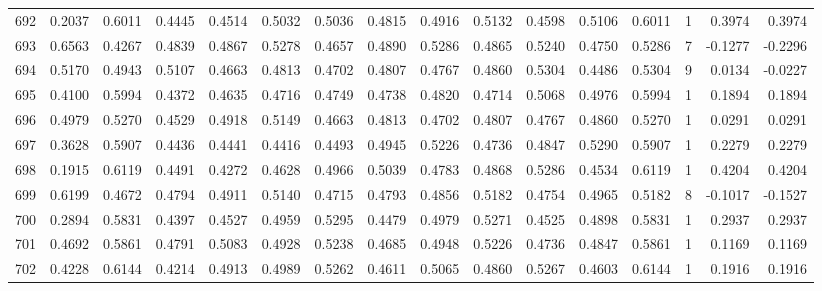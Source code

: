 \begin{tabular}{lrrrrrrrrrrrrrrr}
692 &      0.2037 &  0.6011 &  0.4445 &  0.4514 &  0.5032 &  0.5036 &  0.4815 &  0.4916 &  0.5132 &  0.4598 &   0.5106 &     0.6011 &      1 &                    0.3974 &                     0.3974 \\
693 &      0.6563 &  0.4267 &  0.4839 &  0.4867 &  0.5278 &  0.4657 &  0.4890 &  0.5286 &  0.4865 &  0.5240 &   0.4750 &     0.5286 &      7 &                   -0.1277 &                    -0.2296 \\
694 &      0.5170 &  0.4943 &  0.5107 &  0.4663 &  0.4813 &  0.4702 &  0.4807 &  0.4767 &  0.4860 &  0.5304 &   0.4486 &     0.5304 &      9 &                    0.0134 &                    -0.0227 \\
695 &      0.4100 &  0.5994 &  0.4372 &  0.4635 &  0.4716 &  0.4749 &  0.4738 &  0.4820 &  0.4714 &  0.5068 &   0.4976 &     0.5994 &      1 &                    0.1894 &                     0.1894 \\
696 &      0.4979 &  0.5270 &  0.4529 &  0.4918 &  0.5149 &  0.4663 &  0.4813 &  0.4702 &  0.4807 &  0.4767 &   0.4860 &     0.5270 &      1 &                    0.0291 &                     0.0291 \\
697 &      0.3628 &  0.5907 &  0.4436 &  0.4441 &  0.4416 &  0.4493 &  0.4945 &  0.5226 &  0.4736 &  0.4847 &   0.5290 &     0.5907 &      1 &                    0.2279 &                     0.2279 \\
698 &      0.1915 &  0.6119 &  0.4491 &  0.4272 &  0.4628 &  0.4966 &  0.5039 &  0.4783 &  0.4868 &  0.5286 &   0.4534 &     0.6119 &      1 &                    0.4204 &                     0.4204 \\
699 &      0.6199 &  0.4672 &  0.4794 &  0.4911 &  0.5140 &  0.4715 &  0.4793 &  0.4856 &  0.5182 &  0.4754 &   0.4965 &     0.5182 &      8 &                   -0.1017 &                    -0.1527 \\
700 &      0.2894 &  0.5831 &  0.4397 &  0.4527 &  0.4959 &  0.5295 &  0.4479 &  0.4979 &  0.5271 &  0.4525 &   0.4898 &     0.5831 &      1 &                    0.2937 &                     0.2937 \\
701 &      0.4692 &  0.5861 &  0.4791 &  0.5083 &  0.4928 &  0.5238 &  0.4685 &  0.4948 &  0.5226 &  0.4736 &   0.4847 &     0.5861 &      1 &                    0.1169 &                     0.1169 \\
702 &      0.4228 &  0.6144 &  0.4214 &  0.4913 &  0.4989 &  0.5262 &  0.4611 &  0.5065 &  0.4860 &  0.5267 &   0.4603 &     0.6144 &      1 &                    0.1916 &                     0.1916 \\

\end{tabular}

